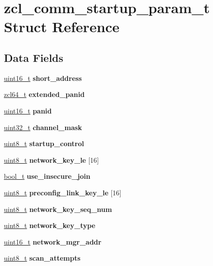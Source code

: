 \hypertarget{structzcl__comm__startup__param__t}{}\section{zcl\+\_\+comm\+\_\+startup\+\_\+param\+\_\+t Struct Reference}
\label{structzcl__comm__startup__param__t}
\subsection*{Data Fields}
\begin{DoxyCompactItemize}
\item 
\hyperlink{group__hal__dos_ga5a8b2dc9e45a9ee81a94ef304fb62505}{uint16\+\_\+t} {\bfseries short\+\_\+address}
\item 
\hyperlink{group__zcl__64_ga2e906cb47fc172ae60da5178075dd3c7}{zcl64\+\_\+t} {\bfseries extended\+\_\+panid}
\item 
\hyperlink{group__hal__dos_ga5a8b2dc9e45a9ee81a94ef304fb62505}{uint16\+\_\+t} {\bfseries panid}
\item 
\hyperlink{group__hal__dos_ga09a1e304d66d35dd47daffee9731edaa}{uint32\+\_\+t} {\bfseries channel\+\_\+mask}
\item 
\hyperlink{group__hal__dos_gae1affc9ca37cfb624959c866a73f83c2}{uint8\+\_\+t} {\bfseries startup\+\_\+control}
\item 
\hyperlink{group__hal__dos_gae1affc9ca37cfb624959c866a73f83c2}{uint8\+\_\+t} {\bfseries network\+\_\+key\+\_\+le} \mbox{[}16\mbox{]}
\item 
\hyperlink{group__hal__dos_ga04dd5074964518403bf944f2b240a5f8}{bool\+\_\+t} {\bfseries use\+\_\+insecure\+\_\+join}
\item 
\hyperlink{group__hal__dos_gae1affc9ca37cfb624959c866a73f83c2}{uint8\+\_\+t} {\bfseries preconfig\+\_\+link\+\_\+key\+\_\+le} \mbox{[}16\mbox{]}
\item 
\hyperlink{group__hal__dos_gae1affc9ca37cfb624959c866a73f83c2}{uint8\+\_\+t} {\bfseries network\+\_\+key\+\_\+seq\+\_\+num}
\item 
\hyperlink{group__hal__dos_gae1affc9ca37cfb624959c866a73f83c2}{uint8\+\_\+t} {\bfseries network\+\_\+key\+\_\+type}
\item 
\hyperlink{group__hal__dos_ga5a8b2dc9e45a9ee81a94ef304fb62505}{uint16\+\_\+t} {\bfseries network\+\_\+mgr\+\_\+addr}
\item 
\hyperlink{group__hal__dos_gae1affc9ca37cfb624959c866a73f83c2}{uint8\+\_\+t} {\bfseries scan\+\_\+attempts}

\end{DoxyCompactItemize}
